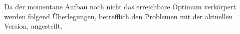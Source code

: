 Da der momentane Aufbau noch nicht das erreichbare Optimum verkörpert werden folgend Überlegungen, betrefflich den Problemen mit der aktuellen Version, angestellt.